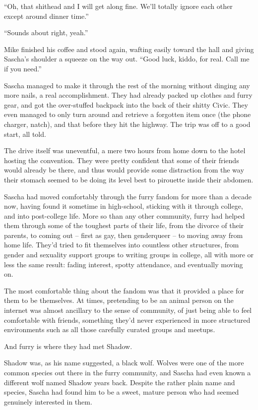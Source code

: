 ``Oh, that shithead and I will get along fine. We'll totally ignore each other except around dinner time.''

``Sounds about right, yeah.''

Mike finished his coffee and stood again, wafting easily toward the hall and giving Sascha's shoulder a squeeze on the way out. ``Good luck, kiddo, for real. Call me if you need.''

\secdiv

Sascha managed to make it through the rest of the morning without dinging any more nails, a real accomplishment. They had already packed up clothes and furry gear, and got the over-stuffed backpack into the back of their shitty Civic. They even managed to only turn around and retrieve a forgotten item once (the phone charger, natch), and that before they hit the highway. The trip was off to a good start, all told.

The drive itself was uneventful, a mere two hours from home down to the hotel hosting the convention. They were pretty confident that some of their friends would already be there, and thus would provide some distraction from the way their stomach seemed to be doing its level best to pirouette inside their abdomen.

Sascha had moved comfortably through the furry fandom for more than a decade now, having found it sometime in high-school, sticking with it through college, and into post-college life. More so than any other community, furry had helped them through some of the toughest parts of their life, from the divorce of their parents, to coming out -- first as gay, then genderqueer -- to moving away from home life. They'd tried to fit themselves into countless other structures, from gender and sexuality support groups to writing groups in college, all with more or less the same result: fading interest, spotty attendance, and eventually moving on.

The most comfortable thing about the fandom was that it provided a place for them to be themselves. At times, pretending to be an animal person on the internet was almost ancillary to the sense of community, of just being able to feel comfortable with friends, something they'd never experienced in more structured environments such as all those carefully curated groups and meetups.

And furry is where they had met Shadow.

Shadow was, as his name suggested, a black wolf. Wolves were one of the more common species out there in the furry community, and Sascha had even known a different wolf named Shadow years back. Despite the rather plain name and species, Sascha had found him to be a sweet, mature person who had seemed genuinely interested in them.

